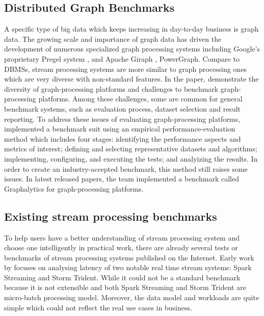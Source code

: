 \subsection{ Distributed Graph Benchmarks}

A specific type of big data which keeps increasing in day-to-day business is graph data. The growing scale and importance of graph data has driven the development of numerous specialized graph processing systems including Google's proprietary Pregel system \cite{Pregel}, and Apache Giraph \cite{Giraph}, PowerGraph\cite{PowerGraph}. Compare to DBMSs, stream processing systems are more similar to graph processing ones which are very diverse with non-standard features. In the paper, \citet{guo2014benchmarking} demonstrate the diversity of graph-processing platforms and challenges to benchmark graph-processing platforms. Among these challenges, some are common for general benchmark systems, such as evaluation process, dataset selection and result reporting. To address these issues of evaluating graph-processing platforms, \citeauthor{guo2014well} implemented a benchmark suit using an empirical performance-evaluation method which includes four stages: identifying the performance aspects and metrics of interest; defining and selecting representative datasets and algorithms; implementing, configuring, and executing the tests; and analyizing the results. In order to create an industry-accepted benchmark, this method still raises some issues. In latest released papers\cite{iosup2014towards, capota2015graphalytics}, the team implemented a benchmark called Graphalytics for graph-processing platforms. 

\subsection{ Existing stream processing benchmarks}

To help users have a better understanding of stream processing system and choose one intelligently in practical work, there are already several tests or benchmarks of stream processing systems published on the Internet. Early work by \citet{cordovaanalysis} focuses on analysing latency of two notable real time stream systems: Spark Streaming and Storm Trident. While it could not be a standard benchmark because it is not extensible and both Spark Streaming and Storm Trident are micro-batch processing model. Moreover, the data model and workloads are quite simple which could not reflect the real use cases in business. 

